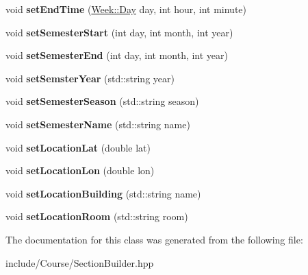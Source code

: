 \begin{DoxyCompactItemize}
\item 
\hypertarget{class_section_1_1_section_builder_a5df7b82786d629c7feed3f4e6ebfc0a9}{}void {\bfseries set\+End\+Time} (\hyperlink{class_week_a1f85a077c83820a97fad2a6d50c3a075}{Week\+::\+Day} day, int hour, int minute)\label{class_section_1_1_section_builder_a5df7b82786d629c7feed3f4e6ebfc0a9}

\item 
\hypertarget{class_section_1_1_section_builder_a199170e6035d5dce31d4a5b7d85d70aa}{}void {\bfseries set\+Semester\+Start} (int day, int month, int year)\label{class_section_1_1_section_builder_a199170e6035d5dce31d4a5b7d85d70aa}

\item 
\hypertarget{class_section_1_1_section_builder_a2b63c846d8a83d0c46858b3b9f5f1fd0}{}void {\bfseries set\+Semester\+End} (int day, int month, int year)\label{class_section_1_1_section_builder_a2b63c846d8a83d0c46858b3b9f5f1fd0}

\item 
\hypertarget{class_section_1_1_section_builder_a38b692ab9434cfd0e315a8c1123d362d}{}void {\bfseries set\+Semster\+Year} (std\+::string year)\label{class_section_1_1_section_builder_a38b692ab9434cfd0e315a8c1123d362d}

\item 
\hypertarget{class_section_1_1_section_builder_a61024b46623cb928f01bc912400535f2}{}void {\bfseries set\+Semester\+Season} (std\+::string season)\label{class_section_1_1_section_builder_a61024b46623cb928f01bc912400535f2}

\item 
\hypertarget{class_section_1_1_section_builder_a56963cf5f60ceaec7ce3b42b08ab0a00}{}void {\bfseries set\+Semester\+Name} (std\+::string name)\label{class_section_1_1_section_builder_a56963cf5f60ceaec7ce3b42b08ab0a00}

\item 
\hypertarget{class_section_1_1_section_builder_a0b5adb559f1e80157438acce1b4852b8}{}void {\bfseries set\+Location\+Lat} (double lat)\label{class_section_1_1_section_builder_a0b5adb559f1e80157438acce1b4852b8}

\item 
\hypertarget{class_section_1_1_section_builder_adcbc94c489ebef0f73072991213ea354}{}void {\bfseries set\+Location\+Lon} (double lon)\label{class_section_1_1_section_builder_adcbc94c489ebef0f73072991213ea354}

\item 
\hypertarget{class_section_1_1_section_builder_a0b6e98442d504d8850cd723546bf208a}{}void {\bfseries set\+Location\+Building} (std\+::string name)\label{class_section_1_1_section_builder_a0b6e98442d504d8850cd723546bf208a}

\item 
\hypertarget{class_section_1_1_section_builder_a8753694f227cde012de3bdd56ffee7d0}{}void {\bfseries set\+Location\+Room} (std\+::string room)\label{class_section_1_1_section_builder_a8753694f227cde012de3bdd56ffee7d0}

\end{DoxyCompactItemize}


The documentation for this class was generated from the following file\+:\begin{DoxyCompactItemize}
\item 
include/\+Course/Section\+Builder.\+hpp\end{DoxyCompactItemize}
